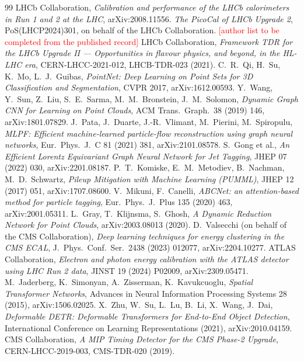 \documentclass[11pt,a4paper]{article}
\newcommand{\todo}[1]{\textcolor{red}{[#1]}}
\begin{document}
\begin{thebibliography}{99}
 LHCb Collaboration,
\emph{Calibration and performance of the LHCb calorimeters in Run 1 and 2 at the LHC},
arXiv:2008.11556.
 \emph{The PicoCal of LHCb Upgrade 2},
PoS(LHCP2024)301, on behalf of the LHCb Collaboration.
\todo{author list to be completed from the published record}
 LHCb Collaboration,
\emph{Framework TDR for the LHCb Upgrade II --- Opportunities in flavour
physics, and beyond, in the HL-LHC era},
CERN-LHCC-2021-012, LHCB-TDR-023 (2021).
 C.~R.~Qi, H.~Su, K.~Mo, L.~J.~Guibas,
\emph{PointNet: Deep Learning on Point Sets for 3D Classification and
Segmentation}, CVPR 2017, arXiv:1612.00593.
 Y.~Wang, Y.~Sun, Z.~Liu, S.~E.~Sarma, M.~M.~Bronstein,
J.~M.~Solomon, \emph{Dynamic Graph CNN for Learning on Point Clouds},
ACM Trans.\ Graph.\ 38 (2019) 146, arXiv:1801.07829.
 J.~Pata, J.~Duarte, J.-R.~Vlimant, M.~Pierini,
M.~Spiropulu, \emph{MLPF: Efficient machine-learned particle-flow
reconstruction using graph neural networks},
Eur.\ Phys.\ J.\ C 81 (2021) 381, arXiv:2101.08578.
 S.~Gong et al.,
\emph{An Efficient Lorentz Equivariant Graph Neural Network for Jet
Tagging}, JHEP 07 (2022) 030, arXiv:2201.08187.
 P.~T.~Komiske, E.~M.~Metodiev, B.~Nachman,
M.~D.~Schwartz, \emph{Pileup Mitigation with Machine Learning (PUMML)},
JHEP 12 (2017) 051, arXiv:1707.08600.
 V.~Mikuni, F.~Canelli,
\emph{ABCNet: an attention-based method for particle tagging},
Eur.\ Phys.\ J.\ Plus 135 (2020) 463, arXiv:2001.05311.
 L.~Gray, T.~Klijnsma, S.~Ghosh,
\emph{A Dynamic Reduction Network for Point Clouds},
arXiv:2003.08013 (2020).
 D.~Valsecchi (on behalf of the CMS Collaboration),
\emph{Deep learning techniques for energy clustering in the CMS ECAL},
J.\ Phys.\ Conf.\ Ser.\ 2438 (2023) 012077, arXiv:2204.10277.
 ATLAS Collaboration,
\emph{Electron and photon energy calibration with the ATLAS detector using
LHC Run 2 data}, JINST 19 (2024) P02009, arXiv:2309.05471.
 M.~Jaderberg, K.~Simonyan, A.~Zisserman, K.~Kavukcuoglu,
\emph{Spatial Transformer Networks},
Advances in Neural Information Processing Systems 28 (2015),
arXiv:1506.02025.
 X.~Zhu, W.~Su, L.~Lu, B.~Li, X.~Wang, J.~Dai,
\emph{Deformable DETR: Deformable Transformers for End-to-End Object
Detection}, International Conference on Learning Representations (2021),
arXiv:2010.04159.
 CMS Collaboration,
\emph{A MIP Timing Detector for the CMS Phase-2 Upgrade},
CERN-LHCC-2019-003, CMS-TDR-020 (2019).

\end{thebibliography}
\end{document}

